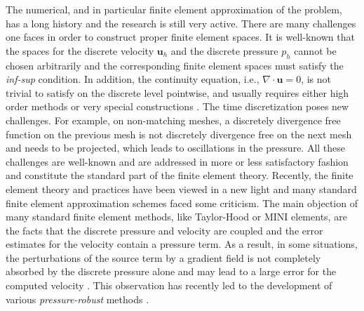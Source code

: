 \documentclass{m2an}
\newcommand{\1}{\mathds{1}}
\renewcommand{\u}{\mathbf{u}}
\theoremstyle{definition}
\begin{document}
The numerical, and in particular finite element approximation of the problem, has a long history and the research is still very active. There are many challenges one faces in order to construct  proper finite element spaces. It is well-known that the spaces for the discrete velocity $\u_h$ and the discrete pressure $p_h$ cannot be chosen arbitrarily and the corresponding finite element spaces must satisfy the {\it inf-sup} condition. In addition, the continuity equation, i.e.,  $\nabla \cdot \u = 0$, is not trivial to satisfy on the discrete level pointwise, and usually requires either high order methods \cite{AinsworthM_ParkerC_2021, FalkR_NeilanM_2013, ScottR_VogeliusM_1985} or very special constructions  \cite{ GuzmanJ_NeilanM_2014b, GuzmanJ_NeilanM_2014}. The time discretization poses new challenges. For example, on non-matching meshes, a discretely divergence free function on 
  the previous mesh is not discretely divergence free on the next mesh and needs to be projected, which
leads to oscillations in the pressure.
All these challenges are well-known and are addressed in more or less satisfactory fashion and constitute the standard part of the finite element theory. 
Recently, the  finite element theory and practices have been viewed in a new light and many standard finite element approximation schemes faced some criticism. The main objection of  many standard finite element methods, like Taylor-Hood or MINI elements, are the facts that the discrete pressure and velocity are coupled and the error estimates for the velocity contain a pressure term. As a result, in some situations, the perturbations of the source term by a gradient field is not completely absorbed by the discrete pressure alone and may lead to a large error for the computed velocity \cite{JohnV_LinkeA_MerdonC_NeilanM_RebholzL_2017}. This observation has recently led to the development of various  {\it pressure-robust} methods \cite{AhmedN_BarrenecheaG_BurmanE_GuzmanJ_LinkeA_MerdonC_2021, AhmedN_LinkeA_MerdonC_2018, LinkeA_MerdonC_NeilanM_2020}. 
\end{document}
